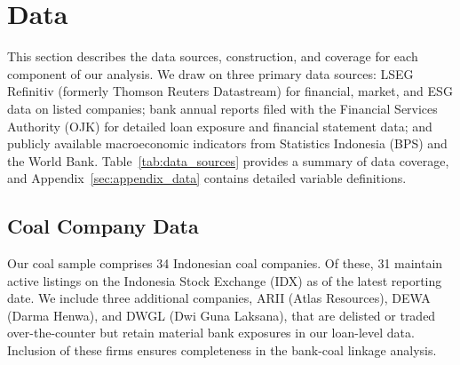 
\section{Data}
\label{sec:data}

This section describes the data sources, construction, and coverage for each component of our analysis. We draw on three primary data sources: LSEG Refinitiv (formerly Thomson Reuters Datastream) for financial, market, and ESG data on listed companies; bank annual reports filed with the Financial Services Authority (OJK) for detailed loan exposure and financial statement data; and publicly available macroeconomic indicators from Statistics Indonesia (BPS) and the World Bank. Table~\ref{tab:data_sources} provides a summary of data coverage, and Appendix~\ref{sec:appendix_data} contains detailed variable definitions.

\subsection{Coal Company Data}
\label{subsec:coal_data}

Our coal sample comprises 34 Indonesian coal companies. Of these, 31 maintain active listings on the Indonesia Stock Exchange (IDX) as of the latest reporting date. We include three additional companies, ARII (Atlas Resources), DEWA (Darma Henwa), and DWGL (Dwi Guna Laksana), that are delisted or traded over-the-counter but retain material bank exposures in our loan-level data. Inclusion of these firms ensures completeness in the bank-coal linkage analysis.

